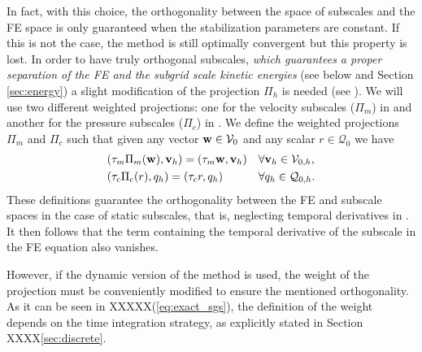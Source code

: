 In fact, with this choice, the orthogonality between the space of subscales and the FE space is only guaranteed when the stabilization parameters are constant. If this is not the case, the method is still optimally convergent \cite{Codina_2008a} but this property is lost. In order to have truly orthogonal subscales, \emph{which guarantees a proper separation of the FE and the subgrid scale kinetic energies} (see below and Section \ref{sec:energy}) a slight modification of the projection $\Pi_h$ is needed (see \cite{Codina_2008a}). We will use two different weighted projections: one for the velocity subscales ($\Pi_m$) in  and another for the pressure subscales ($\Pi_c$) in . We define the weighted projections $\Pi_m$ and $\Pi_c$ such that given any vector ${\bf w}\in\mathcal{V}_0$ and any scalar $r\in\mathcal{Q}_0$ we have
\begin{align}
\label{eq-C2_Pi_tau_m}
&(\tau_m\Pi_m({\bf w}),{\bf v}_h)=(\tau_m{\bf w},{\bf v}_h)&&\forall{\bf v}_h\in\mathcal{V}_{0,h},\\
\label{eq-C2_Pi_tau_c}
&(\tau_c\Pi_c(r),q_h)=(\tau_cr,q_h)&&\forall q_h\in\mathcal{Q}_{0,h}.
\end{align}
These definitions guarantee the orthogonality between the FE and subscale spaces in the case of static subscales, that is, neglecting temporal derivatives in . It then follows that the term containing the temporal derivative of the subscale in the FE equation  also vanishes.

However, if the dynamic version of the method is used, the weight of the projection  must be conveniently modified to ensure the mentioned orthogonality. As it can be seen in XXXXX(\ref{eq:exact_sgs}), the definition of the weight depends on the time integration strategy, as explicitly stated in Section XXXX\ref{sec:discrete}.